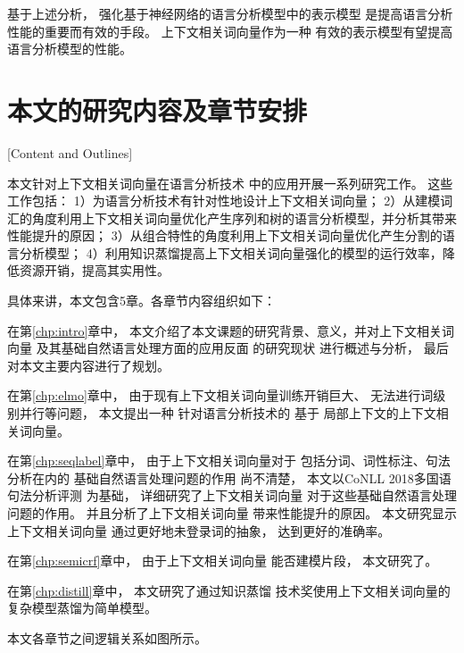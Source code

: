 基于上述分析，
强化基于神经网络的语言分析模型中的表示模型
是提高语言分析性能的重要而有效的手段。
上下文相关词向量作为一种
有效的表示模型有望提高
语言分析模型的性能。

\section{本文的研究内容及章节安排}[Content and Outlines]

本文针对上下文相关词向量在语言分析技术
中的应用开展一系列研究工作。
这些工作包括：
1）为语言分析技术有针对性地设计上下文相关词向量；
2）从建模词汇的角度利用上下文相关词向量优化产生序列和树的语言分析模型，并分析其带来性能提升的原因；
3）从组合特性的角度利用上下文相关词向量优化产生分割的语言分析模型；
4）利用知识蒸馏提高上下文相关词向量强化的模型的运行效率，降低资源开销，提高其实用性。

具体来讲，本文包含5章。各章节内容组织如下：

在第\ref{chp:intro}章中，
本文介绍了本文课题的研究背景、意义，并对上下文相关词向量
及其基础自然语言处理方面的应用反面
的研究现状
进行概述与分析，
最后对本文主要内容进行了规划。

在第\ref{chp:elmo}章中，
由于现有上下文相关词向量训练开销巨大、
无法进行词级别并行等问题，
本文提出一种
针对语言分析技术的
基于
局部上下文的上下文相关词向量。

在第\ref{chp:seqlabel}章中，
由于上下文相关词向量对于
包括分词、词性标注、句法分析在内的
基础自然语言处理问题的作用
尚不清楚，
本文以CoNLL 2018多国语句法分析评测
为基础，
详细研究了上下文相关词向量
对于这些基础自然语言处理问题的作用。
并且分析了上下文相关词向量
带来性能提升的原因。
本文研究显示上下文相关词向量
通过更好地未登录词的抽象，
达到更好的准确率。

在第\ref{chp:semicrf}章中，
由于上下文相关词向量
能否建模片段，
本文研究了。

在第\ref{chp:distill}章中，
本文研究了通过知识蒸馏
技术奖使用上下文相关词向量的
复杂模型蒸馏为简单模型。

本文各章节之间逻辑关系如图所示。